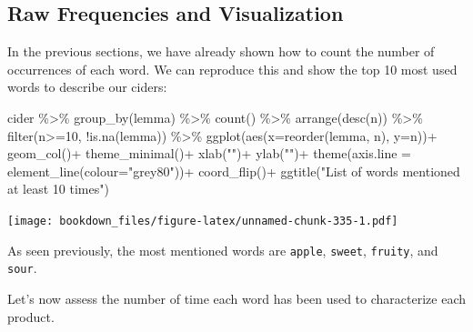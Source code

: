\documentclass[
]{krantz}
\makeatletter
\newenvironment{Shaded}{\begin{snugshade}}{\end{snugshade}}
\newcommand{\AttributeTok}[1]{\textcolor[rgb]{0.61,0.61,0.61}{#1}}
\newcommand{\DecValTok}[1]{\textcolor[rgb]{0.06,0.06,0.06}{#1}}
\newcommand{\FunctionTok}[1]{\textcolor[rgb]{0,0,0}{#1}}
\newcommand{\NormalTok}[1]{#1}
\newcommand{\SpecialCharTok}[1]{\textcolor[rgb]{0,0,0}{#1}}
\newcommand{\StringTok}[1]{\textcolor[rgb]{0.5,0.5,0.5}{#1}}
\newenvironment{kframe}{%
\medskip{}
\setlength{\fboxsep}{.8em}
 \def\at@end@of@kframe{}%
 \ifinner\ifhmode%
  \def\at@end@of@kframe{\end{minipage}}%
  \begin{minipage}{\columnwidth}%
 \fi\fi%
 \def\FrameCommand##1{\hskip\@totalleftmargin \hskip-\fboxsep
 \colorbox{shadecolor}{##1}\hskip-\fboxsep
     \hskip-\linewidth \hskip-\@totalleftmargin \hskip\columnwidth}%
 \MakeFramed {\advance\hsize-\width
   \@totalleftmargin\z@ \linewidth\hsize
   \@setminipage}}%
 {\par\unskip\endMakeFramed%
 \at@end@of@kframe}
\renewenvironment{Shaded}{\begin{kframe}}{\end{kframe}}
\makeatother
\begin{document}
\hypertarget{raw-frequencies-and-visualization}{%
\subsection{Raw Frequencies and Visualization}\label{raw-frequencies-and-visualization}}

In the previous sections, we have already shown how to count the number of occurrences of each word. We can reproduce this and show the top 10 most used words to describe our ciders:

\begin{Shaded}
\begin{Highlighting}[]
\NormalTok{cider }\SpecialCharTok{\%\textgreater{}\%} 
  \FunctionTok{group\_by}\NormalTok{(lemma) }\SpecialCharTok{\%\textgreater{}\%} 
  \FunctionTok{count}\NormalTok{() }\SpecialCharTok{\%\textgreater{}\%} 
  \FunctionTok{arrange}\NormalTok{(}\FunctionTok{desc}\NormalTok{(n)) }\SpecialCharTok{\%\textgreater{}\%} 
  \FunctionTok{filter}\NormalTok{(n}\SpecialCharTok{\textgreater{}=}\DecValTok{10}\NormalTok{, }\SpecialCharTok{!}\FunctionTok{is.na}\NormalTok{(lemma)) }\SpecialCharTok{\%\textgreater{}\%} 
  \FunctionTok{ggplot}\NormalTok{(}\FunctionTok{aes}\NormalTok{(}\AttributeTok{x=}\FunctionTok{reorder}\NormalTok{(lemma, n), }\AttributeTok{y=}\NormalTok{n))}\SpecialCharTok{+}
  \FunctionTok{geom\_col}\NormalTok{()}\SpecialCharTok{+}
  \FunctionTok{theme\_minimal}\NormalTok{()}\SpecialCharTok{+}
  \FunctionTok{xlab}\NormalTok{(}\StringTok{""}\NormalTok{)}\SpecialCharTok{+}
  \FunctionTok{ylab}\NormalTok{(}\StringTok{""}\NormalTok{)}\SpecialCharTok{+}
  \FunctionTok{theme}\NormalTok{(}\AttributeTok{axis.line =} \FunctionTok{element\_line}\NormalTok{(}\AttributeTok{colour=}\StringTok{"grey80"}\NormalTok{))}\SpecialCharTok{+}
  \FunctionTok{coord\_flip}\NormalTok{()}\SpecialCharTok{+}
  \FunctionTok{ggtitle}\NormalTok{(}\StringTok{"List of words mentioned at least 10 times"}\NormalTok{)}
\end{Highlighting}
\end{Shaded}

\texttt{[image: bookdown\_files/figure-latex/unnamed-chunk-335-1.pdf]}

As seen previously, the most mentioned words are \texttt{apple}, \texttt{sweet}, \texttt{fruity}, and \texttt{sour}.

Let's now assess the number of time each word has been used to characterize each product.
\end{document}
